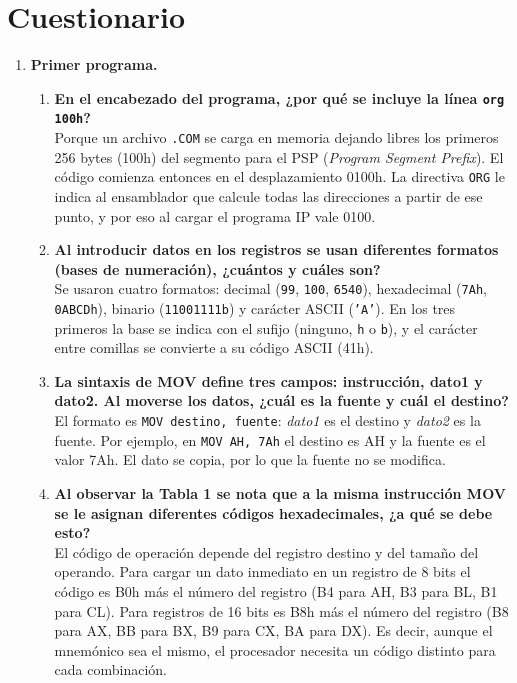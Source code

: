 \documentclass[10pt]{article}
\begin{document}
\section{Cuestionario}

\begin{enumerate}
  \renewcommand{\labelenumi}{\alph{enumi})}
  \renewcommand{\labelenumii}{\arabic{enumii}.}

  \item \textbf{Primer programa.}
  \begin{enumerate}
    \item \textbf{En el encabezado del programa, ¿por qué se incluye la línea \texttt{org 100h}?}\\
    Porque un archivo \texttt{.COM} se carga en memoria dejando libres los primeros 256 bytes (100h) del segmento para el PSP (\textit{Program Segment Prefix}). El código comienza entonces en el desplazamiento 0100h. La directiva \texttt{ORG} le indica al ensamblador que calcule todas las direcciones a partir de ese punto, y por eso al cargar el programa IP vale 0100.

    \item \textbf{Al introducir datos en los registros se usan diferentes formatos (bases de numeración), ¿cuántos y cuáles son?}\\
    Se usaron cuatro formatos: decimal (\texttt{99}, \texttt{100}, \texttt{6540}), hexadecimal (\texttt{7Ah}, \texttt{0ABCDh}), binario (\texttt{11001111b}) y carácter ASCII (\texttt{'A'}). En los tres primeros la base se indica con el sufijo (ninguno, \texttt{h} o \texttt{b}), y el carácter entre comillas se convierte a su código ASCII (41h).

    \item \textbf{La sintaxis de MOV define tres campos: instrucción, dato1 y dato2. Al moverse los datos, ¿cuál es la fuente y cuál el destino?}\\
    El formato es \texttt{MOV destino, fuente}: \textit{dato1} es el destino y \textit{dato2} es la fuente. Por ejemplo, en \texttt{MOV AH, 7Ah} el destino es AH y la fuente es el valor 7Ah. El dato se copia, por lo que la fuente no se modifica.

    \item \textbf{Al observar la Tabla 1 se nota que a la misma instrucción MOV se le asignan diferentes códigos hexadecimales, ¿a qué se debe esto?}\\
    El código de operación depende del registro destino y del tamaño del operando. Para cargar un dato inmediato en un registro de 8 bits el código es B0h más el número del registro (B4 para AH, B3 para BL, B1 para CL). Para registros de 16 bits es B8h más el número del registro (B8 para AX, BB para BX, B9 para CX, BA para DX). Es decir, aunque el mnemónico sea el mismo, el procesador necesita un código distinto para cada combinación.


\end{enumerate}
\end{enumerate}
\end{document}
